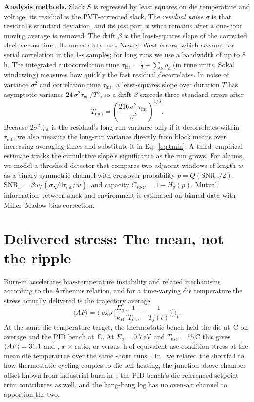 \documentclass[10pt,twocolumn]{article}
\newcommand{\Tmin}{T_{\min}}
\newcommand{\tint}{\tau_{\mathrm{int}}}
\newcommand{\degC}{\,\textdegree C}
\newcommand{\unit}[1]{\,\mathrm{#1}}
\begin{document}
\textbf{Analysis methods.} Slack $S$ is regressed by least squares on die temperature and voltage; its residual is the PVT-corrected slack. The \emph{residual noise} $\sigma$ is that residual's standard deviation, and its \emph{fast} part is what remains after a one-hour moving average is removed. The drift $\beta$ is the least-squares slope of the corrected slack versus time. Its uncertainty uses Newey--West errors, which account for serial correlation in the 1-s samples; for long runs we use a bandwidth of up to 8\,h. The integrated autocorrelation time $\tint=\tfrac{1}{2}+\sum_k\rho_k$ (in time units, Sokal windowing) measures how quickly the fast residual decorrelates. In noise of variance $\sigma^2$ and correlation time $\tint$, a least-squares slope over duration $T$ has asymptotic variance $24\,\sigma^2\tint/T^3$, so a drift $\beta$ exceeds three standard errors after
\begin{equation}
\Tmin=\left(\frac{216\,\sigma^2\,\tint}{\beta^2}\right)^{1/3}.
\label{eq:tmin}
\end{equation}
Because $2\sigma^2\tint$ is the residual's long-run variance only if it decorrelates within $\tint$, we also measure the long-run variance directly from block means over increasing averaging times and substitute it in Eq.~\eqref{eq:tmin}. A third, empirical estimate tracks the cumulative slope's significance as the run grows. For alarms, we model a threshold detector that compares two adjacent windows of length $w$ as a binary symmetric channel with crossover probability $p=Q(\mathrm{SNR}_w/2)$, $\mathrm{SNR}_w=\beta w/(\sigma\sqrt{4\tint/w})$, and capacity $C_{\mathrm{BSC}}=1-H_2(p)$. Mutual information between slack and environment is estimated on binned data with Miller--Madow bias correction.

\section{Delivered stress: The mean, not the ripple}

Burn-in accelerates bias-temperature instability and related mechanisms according to the Arrhenius relation, and for a time-varying die temperature the stress actually delivered is the trajectory average
\begin{equation}
\langle AF\rangle=\Big\langle \exp\!\Big[\frac{E_a}{k_B}\Big(\frac{1}{T_{\mathrm{use}}}-\frac{1}{T_j(t)}\Big)\Big]\Big\rangle_t .
\label{eq:af}
\end{equation}
At the same die-temperature target, the thermostatic bench held the die at \vTBB\degC{} on average and the PID bench at \vTPID\degC. At $E_a=0.7\unit{eV}$ and $T_{\mathrm{use}}=55$\degC{} this gives $\langle AF\rangle=31.1$ and \vAFPID, a \vAFratio$\times$ ratio, or \vEqhBB{} versus \vEqhPID\,h of equivalent use-condition stress at the mean die temperature over the same \vDurPair-hour runs~\cite{sbcci26}. In~\cite{sbcci26} we related the shortfall to how thermostatic cycling couples to die self-heating, the junction-above-chamber offset known from industrial burn-in~\cite{vassighi,semenov}; the PID bench's die-referenced setpoint trim contributes as well, and the bang-bang log has no oven-air channel to apportion the two.
\end{document}
